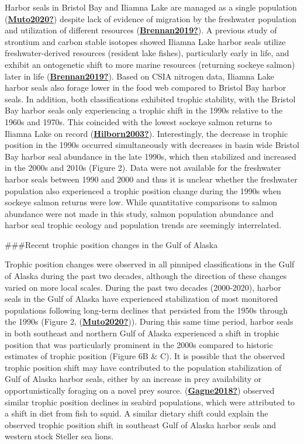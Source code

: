 \documentclass [11pt, proquest] {uwthesis}[2015/03/03]
\begin{document}
Harbor seals in Bristol Bay and Iliamna Lake are managed as a single population (\protect\hyperlink{ref-Muto2020}{\textbf{Muto2020?}}) despite lack of evidence of migration by the freshwater population and utilization of different resources (\protect\hyperlink{ref-Brennan2019}{\textbf{Brennan2019?}}). A previous study of strontium and carbon stable isotopes showed Iliamna Lake harbor seals utilize freshwater-derived resources (resident lake fishes), particularly early in life, and exhibit an ontogenetic shift to more marine resources (returning sockeye salmon) later in life (\protect\hyperlink{ref-Brennan2019}{\textbf{Brennan2019?}}). Based on CSIA nitrogen data, Iliamna Lake harbor seals also forage lower in the food web compared to Bristol Bay harbor seals. In addition, both classifications exhibited trophic stability, with the Bristol Bay harbor seals only experiencing a trophic shift in the 1990s relative to the 1960s and 1970s. This coincided with the lowest sockeye salmon returns to Iliamna Lake on record (\protect\hyperlink{ref-Hilborn2003}{\textbf{Hilborn2003?}}). Interestingly, the decrease in trophic position in the 1990s occurred simultaneously with decreases in basin wide Bristol Bay harbor seal abundance in the late 1990s, which then stabilized and increased in the 2000s and 2010s (Figure 2). Data were not available for the freshwater harbor seals between 1990 and 2000 and thus it is unclear whether the freshwater population also experienced a trophic position change during the 1990s when sockeye salmon returns were low. While quantitative comparisons to salmon abundance were not made in this study, salmon population abundance and harbor seal trophic ecology and population trends are seemingly interrelated.

\#\#\#Recent trophic position changes in the Gulf of Alaska

Trophic position changes were observed in all pinniped classifications in the Gulf of Alaska during the past two decades, although the direction of these changes varied on more local scales. During the past two decades (2000-2020), harbor seals in the Gulf of Alaska have experienced stabilization of most monitored populations following long-term declines that persisted from the 1950s through the 1990s (Figure 2, (\protect\hyperlink{ref-Muto2020}{\textbf{Muto2020?}})). During this same time period, harbor seals in both southeast and northern Gulf of Alaska experienced a shift in trophic position that was particularly prominent in the 2000s compared to historic estimates of trophic position (Figure 6B \& C). It is possible that the observed trophic position shift may have contributed to the population stabilization of Gulf of Alaska harbor seals, either by an increase in prey availability or opportunistically foraging on a novel prey source. (\protect\hyperlink{ref-Gagne2018}{\textbf{Gagne2018?}}) observed similar trophic position declines in seabird populations, which were attributed to a shift in diet from fish to squid. A similar dietary shift could explain the observed trophic position shift in southeast Gulf of Alaska harbor seals and western stock Steller sea lions.
\end{document}
